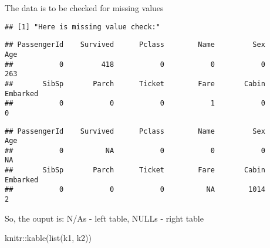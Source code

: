 \documentclass[
]{article}
\newenvironment{Shaded}{\begin{snugshade}}{\end{snugshade}}
\newcommand{\FunctionTok}[1]{\textcolor[rgb]{0.00,0.00,0.00}{#1}}
\newcommand{\NormalTok}[1]{#1}
\newcommand{\SpecialCharTok}[1]{\textcolor[rgb]{0.00,0.00,0.00}{#1}}
\begin{document}
The data is to be checked for missing values

\begin{verbatim}
## [1] "Here is missing value check:"
\end{verbatim}

\begin{verbatim}
## PassengerId    Survived      Pclass        Name         Sex         Age 
##           0         418           0           0           0         263 
##       SibSp       Parch      Ticket        Fare       Cabin    Embarked 
##           0           0           0           1           0           0
\end{verbatim}

\begin{verbatim}
## PassengerId    Survived      Pclass        Name         Sex         Age 
##           0          NA           0           0           0          NA 
##       SibSp       Parch      Ticket        Fare       Cabin    Embarked 
##           0           0           0          NA        1014           2
\end{verbatim}

So, the ouput is: N/As - left table, NULLs - right table

\begin{Shaded}
\begin{Highlighting}[]
\NormalTok{knitr}\SpecialCharTok{::}\FunctionTok{kable}\NormalTok{(}\FunctionTok{list}\NormalTok{(k1, k2))}
\end{Highlighting}
\end{Shaded}
\end{document}
